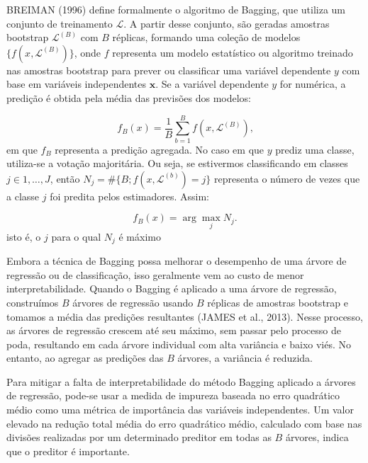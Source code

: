 \documentclass[
  12pt,
  a4paper,
]{scrreprt}
\begin{document}
\vspace{12pt}

BREIMAN (1996) define formalmente o algoritmo de Bagging, que utiliza um
conjunto de treinamento \(\mathcal{L}\). A partir desse conjunto, são
geradas amostras bootstrap \(\mathcal{L}^{(B)}\) com \(B\) réplicas,
formando uma coleção de modelos \(\{f(x, \mathcal{L}^{(B)})\}\), onde
\(f\) representa um modelo estatístico ou algoritmo treinado nas
amostras bootstrap para prever ou classificar uma variável dependente
\(y\) com base em variáveis independentes \(\mathbf{x}\). Se a variável
dependente \(y\) for numérica, a predição é obtida pela média das
previsões dos modelos:

\[
f_{B}\left(x\right) = \frac{1}{B} \sum_{b = 1}^B f \left(x, \mathcal{L}^{\left(B\right)}\right)\text{,}
\] em que \(f_{B}\) representa a predição agregada. No caso em que \(y\)
prediz uma classe, utiliza-se a votação majoritária. Ou seja, se
estivermos classificando em classes \(j \in {1, \dots, J}\), então
\(N_j = \#\{B; f(x, \mathcal{L}^{(b)}) = j\}\) representa o número de
vezes que a classe \(j\) foi predita pelos estimadores. Assim:

\[
f_{B}\left(x\right) = \arg \max_{j} N_j\text{.}
\] isto é, o \(j\) para o qual \(N_j\) é máximo

\vspace{12pt}

Embora a técnica de Bagging possa melhorar o desempenho de uma árvore de
regressão ou de classificação, isso geralmente vem ao custo de menor
interpretabilidade. Quando o Bagging é aplicado a uma árvore de
regressão, construímos \(B\) árvores de regressão usando \(B\) réplicas
de amostras bootstrap e tomamos a média das predições resultantes (JAMES
et al., 2013). Nesse processo, as árvores de regressão crescem até seu
máximo, sem passar pelo processo de poda, resultando em cada árvore
individual com alta variância e baixo viés. No entanto, ao agregar as
predições das \(B\) árvores, a variância é reduzida.

\vspace{12pt}

Para mitigar a falta de interpretabilidade do método Bagging aplicado a
árvores de regressão, pode-se usar a medida de impureza baseada no erro
quadrático médio como uma métrica de importância das variáveis
independentes. Um valor elevado na redução total média do erro
quadrático médio, calculado com base nas divisões realizadas por um
determinado preditor em todas as \(B\) árvores, indica que o preditor é
importante.
\end{document}
